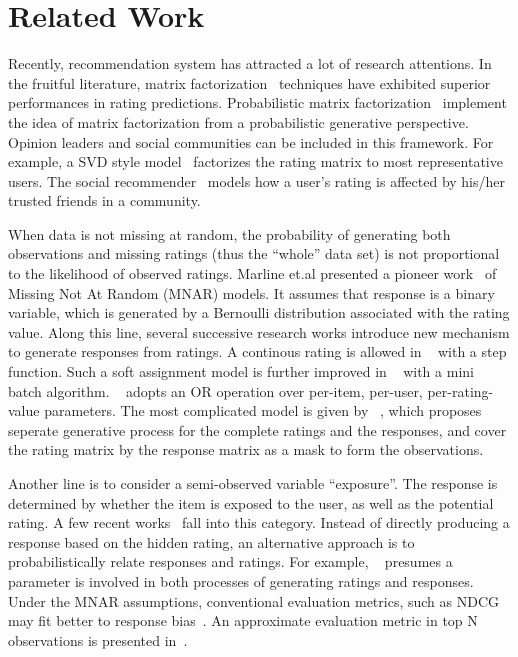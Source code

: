 \documentclass[sigconf]{acmart}
\begin{document}
\section{Related Work}\label{sec:related}
Recently, recommendation system has attracted a lot of research attentions. In the fruitful literature, matrix factorization~\cite{Koren2009Matrix} techniques have exhibited superior performances in rating predictions. Probabilistic matrix factorization~\cite{salakhutdinov2008probabilistic} implement the idea of matrix factorization from a probabilistic generative perspective. Opinion leaders and social communities can be included in this framework. For example, a SVD style model~\cite{Liu2011Wisdom} factorizes the rating matrix to most representative users. The social recommender~\cite{Jamali2011Generalized} models how a user's rating is affected by his/her trusted friends in a community.


When data is not missing at random, the probability of generating both observations and missing ratings (thus the ``whole'' data set) is not proportional to the likelihood of observed ratings. Marline et.al presented a pioneer work~\cite{Marlin2009Collaborative} of Missing Not At Random (MNAR) models. It assumes that response is a binary variable, which is generated by a Bernoulli distribution associated with the rating value. Along this line, several successive research works introduce new mechanism to generate responses from ratings. A continous rating is allowed in ~\cite{Ling2012Response} with a step function. Such a soft assignment model is further improved in ~\cite{Yang2015Boosting} with a mini batch algorithm. ~\cite{Kim2014Bayesian} adopts an OR operation over per-item, per-user, per-rating-value parameters. The most complicated model is given by ~\cite{Hernandez-Lobato2014Probabilistic}, which proposes seperate generative process for the complete ratings and the responses, and cover the rating matrix by the response matrix as a mask to form the observations.

Another line is to consider a semi-observed variable ``exposure''. The response is determined by whether the item is exposed to the user, as well as the potential rating. A few recent works~\cite{Liang2016Modeling,Gopalan2015Scalable} fall into this category. Instead of directly producing a response based on the hidden rating, an alternative approach is to probabilistically relate responses and ratings. For example, ~\cite{Ohsawa2016Gated} presumes a parameter is involved in both processes of generating ratings and responses. Under the MNAR assumptions, conventional evaluation metrics, such as NDCG may fit better to response bias~\cite{Pradel2012Ranking}. An approximate evaluation metric in top N observations is presented in~\cite{Steck2010Training}.
\end{document}
